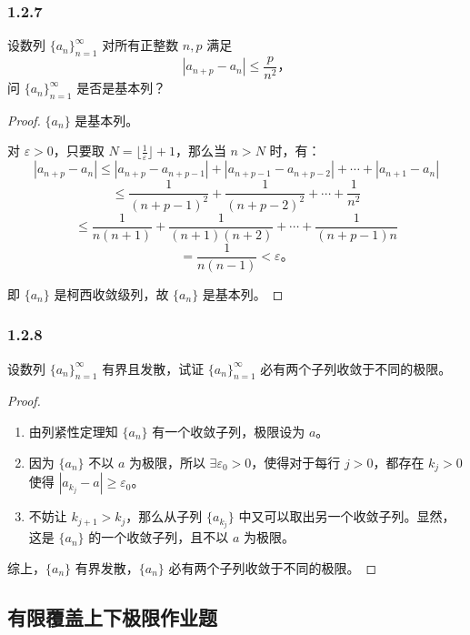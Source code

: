 \documentclass[12pt]{ctexart}
\begin{document}
\subsubsection*{1.2.7} 
设数列 $\{a_n\}_{n=1}^\infty$ 对所有正整数 $n, p$ 满足
\[
|a_{n+p} - a_n| \leq \frac{p}{n^2}，
\]
问 $\{a_n\}_{n=1}^\infty$ 是否是基本列？

\begin{proof}
$\{a_n\}$ 是基本列。

对 $\varepsilon > 0$，只要取 $N = \lfloor \frac{1}{\varepsilon} \rfloor + 1$，那么当 $n > N$ 时，有：
\[
|a_{n+p} - a_n| \leq |a_{n+p} - a_{n+p-1}| + |a_{n+p-1} - a_{n+p-2}| + \cdots + |a_{n+1} - a_n|
\]
\[
\leq \frac{1}{(n+p-1)^2} + \frac{1}{(n+p-2)^2} + \cdots + \frac{1}{n^2}
\]
\[
\leq \frac{1}{n(n+1)} + \frac{1}{(n+1)(n+2)} + \cdots + \frac{1}{(n+p-1)n}
\]
\[
= \frac{1}{n(n-1)} < \varepsilon。
\]

即 $\{a_n\}$ 是柯西收敛级列，故 $\{a_n\}$ 是基本列。
\end{proof}

\subsubsection*{1.2.8} 
设数列 $\{a_n\}_{n=1}^\infty$ 有界且发散，试证 $\{a_n\}_{n=1}^\infty$ 必有两个子列收敛于不同的极限。
\begin{proof}
\begin{enumerate}
    \item 由列紧性定理知 $\{a_n\}$ 有一个收敛子列，极限设为 $a$。
    \item 因为 $\{a_n\}$ 不以 $a$ 为极限，所以 $\exists \varepsilon_0 > 0$，使得对于每行 $j > 0$，都存在 $k_j > 0$ 使得 $|a_{k_j} - a| \geq \varepsilon_0$。
    \item 不妨让 $k_{j+1} > k_j$，那么从子列 $\{a_{k_j}\}$ 中又可以取出另一个收敛子列。显然，这是 $\{a_n\}$ 的一个收敛子列，且不以 $a$ 为极限。
\end{enumerate}

综上，$\{a_n\}$ 有界发散，$\{a_n\}$ 必有两个子列收敛于不同的极限。
\end{proof}

\subsection{有限覆盖上下极限作业题}
\end{document}
